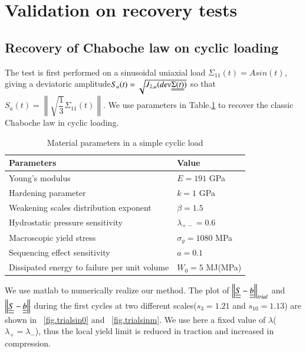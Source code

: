 \documentclass[3p,times,procedia,number]{elsarticle}
\newcommand{\figref}[1]{\figurename~\ref{#1}}
\begin{document}
\clearpage
\section{Validation on recovery tests}
\label{sec:5.8}
\subsection{Recovery of Chaboche law on cyclic loading}
The test is first performed on a sinusoidal uniaxial load $\Sigma_{11}(t)=Asin(t)$, giving a deviatoric amplitude$S_{a}(t)=\sqrt{J_{2,a}(dev\uuline{\Sigma(t)})}$  so that $S_{a}(t)=\left\| \sqrt{\dfrac{1}{3}}\Sigma_{11}(t)\right\| $. We use parameters in Table.\ref{tab:Sin} to recover the classic Chaboche law in cyclic loading.
\begin{table}[!h]
	\centering
	\begin{tabular}{ll}
		\hline
		\textbf{Parameters}                                         & \textbf{Value}                    \\ \hline
		Young's modulus                                             & $E=191$ GPa                       \\
		Hardening parameter                                         &  $k=1$ GPa \\
		Weakening scales distribution exponent                      & $\beta=1.5$                             \\
		Hydrostatic pressure sensitivity                            & $\lambda_{+-}=0.6$                     \\
		Macroscopic yield stress                                    & $\sigma_y=1080$ MPa              \\
		Sequencing effect sensitivity                               & $a=0.1$                        \\
		Dissipated energy to failure per unit volume                & $W_0=5$ MJ(MPa)                       \\ \hline
	\end{tabular}
	\caption{Material parameters in a simple cyclic load }
	\label{tab:Sin}
\end{table}

We use matlab to numerically realize our method. The plot of $\left\|  \uline{\uline{S}}-\uline{\uline{b}}\right\|_{trial}$ and $\left\|  \uline{\uline{S}}-\uline{\uline{b}}\right\|$ during the first cycles at two different scales($s_{3}=1.21$ and $s_{10}=1.13$) are shown in \figref{fig.trialsin0} and \figref{fig.trialsinm}. We use here a fixed value of $\lambda$($\lambda_+=\lambda_-$), thus the local yield limit is reduced in traction and increased
in compression.
\end{document}
